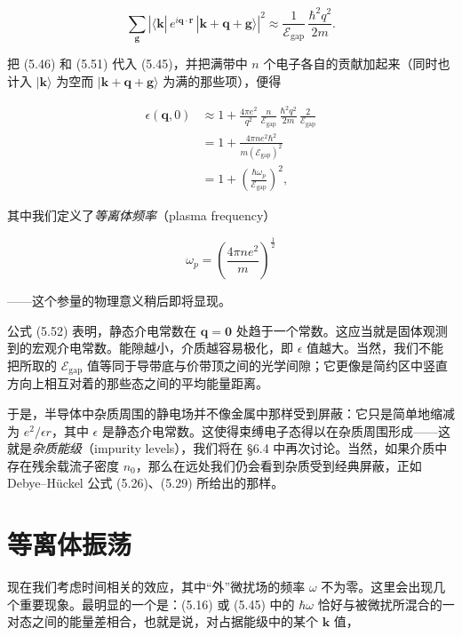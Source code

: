 \begin{equation*}
\sum_{\mathbf{g}} \left| \langle \mathbf{k}|\, e^{i\mathbf{q}\cdot\mathbf{r}}\, |\mathbf{k}+\mathbf{q}+\mathbf{g}\rangle \right|^2 \approx \frac{1}{\mathcal{E}_{\mathrm{gap}}} \, \frac{\hbar^2 q^2}{2m} .
\tag{5.51}
\end{equation*}

把 (5.46) 和 (5.51) 代入 (5.45)，并把满带中 $n$ 个电子各自的贡献加起来（同时也计入 $|\mathbf{k}\rangle$ 为空而 $|\mathbf{k}+\mathbf{q}+\mathbf{g}\rangle$ 为满的那些项），便得

\begin{align*}
\epsilon(\mathbf{q},0) &\approx 1 + \frac{4\pi e^2}{q^2}\, \frac{n}{\mathcal{E}_{\mathrm{gap}}}\, \frac{\hbar^2 q^2}{2m}\, \frac{2}{\mathcal{E}_{\mathrm{gap}}} \\
&= 1 + \frac{4\pi n e^2 \hbar^2}{m\left(\mathcal{E}_{\mathrm{gap}}\right)^2} \\
&= 1 + \left( \frac{\hbar\omega_p}{\mathcal{E}_{\mathrm{gap}}} \right)^2 ,
\tag{5.52}
\end{align*}

其中我们定义了\emph{等离体频率}（plasma frequency）

\begin{equation*}
\omega_p = \left( \frac{4\pi n e^2}{m} \right)^{\frac{1}{2}}
\tag{5.53}
\end{equation*}

——这个参量的物理意义稍后即将显现。

公式 (5.52) 表明，静态介电常数在 $\mathbf{q} = \mathbf{0}$ 处趋于一个常数。这应当就是固体观测到的宏观介电常数。能隙越小，介质越容易极化，即 $\epsilon$ 值越大。当然，我们不能把所取的 $\mathcal{E}_{\mathrm{gap}}$ 值等同于导带底与价带顶之间的光学间隙；它更像是简约区中竖直方向上相互对着的那些态之间的平均能量距离。

于是，半导体中杂质周围的静电场并不像金属中那样受到屏蔽：它只是简单地缩减为 $e^2/\epsilon r$，其中 $\epsilon$ 是静态介电常数。这使得束缚电子态得以在杂质周围形成——这就是\emph{杂质能级}（impurity levels），我们将在 §6.4 中再次讨论。当然，如果介质中存在残余载流子密度 $n_0$，那么在远处我们仍会看到杂质受到经典屏蔽，正如 Debye--Hückel 公式 (5.26)、(5.29) 所给出的那样。

\section{等离体振荡}

现在我们考虑时间相关的效应，其中“外”微扰场的频率 $\omega$ 不为零。这里会出现几个重要现象。最明显的一个是：(5.16) 或 (5.45) 中的 $\hbar\omega$ 恰好与被微扰所混合的一对态之间的能量差相合，也就是说，对占据能级中的某个 $\mathbf{k}$ 值，

